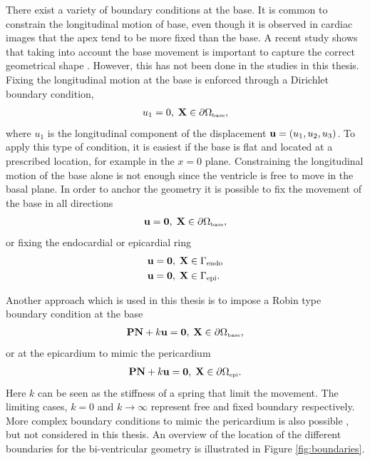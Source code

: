 There exist a variety of boundary conditions at the base.
It is common to constrain the longitudinal motion of
base, even though it is observed in cardiac images that the apex tend
to be more fixed than the base. A recent study shows that taking into
account the base movement is important to capture the correct
geometrical shape \cite{palit2016passive}. However, this has not been
done in the studies in this thesis.
Fixing the longitudinal motion at the base is enforced through a
Dirichlet boundary condition,
\begin{align}
  u_1 = 0,  \;  \mathbf{X} \in \partial \Omega_{ \textnormal{\tiny\text{base}}},
\end{align}
where $u_1$ is the longitudinal component of the displacement $\mathbf{u} =
(u_1, u_2, u_3)$. To apply this type of condition, it is easiest if
the base is flat and located at a prescribed location, for example in
the $x= 0$ plane. Constraining the longitudinal motion of the base
alone is not enough since the ventricle is free to move in the basal
plane. In order to anchor the geometry it is possible to fix the
movement of the base in all directions
\begin{align}
  \mathbf{u} = \mathbf{0},  \;  \mathbf{X} \in \partial \Omega_{ \textnormal{\tiny\text{base}}},
\end{align}
or fixing the endocardial or epicardial ring
\begin{align}
  \mathbf{u} &= \mathbf{0},  \;  \mathbf{X} \in \Gamma_{\mathrm{endo}} \\
  \mathbf{u} &= \mathbf{0},  \;  \mathbf{X} \in \Gamma_{\mathrm{epi}}.
\end{align}

Another approach which is used in this thesis is to impose a Robin
type boundary condition at the base
\begin{align}
  \mathbf{P} \mathbf{N} + k \mathbf{u} = \mathbf{0},  \;  \mathbf{X} \in \partial \Omega_{ \textnormal{\tiny\text{base}}}, 
\end{align}
or at the epicardium to mimic the pericardium
\begin{align}
  \mathbf{P} \mathbf{N} + k \mathbf{u} = \mathbf{0},  \;  \mathbf{X} \in \partial \Omega_{ \textnormal{\tiny \text{epi}}}.
\end{align}
Here $k$ can be seen as the stiffness of a spring that limit the
movement. The limiting cases, $k = 0$ and $k \rightarrow
\infty$ represent free and fixed boundary respectively.
More complex boundary conditions to mimic the pericardium is also
possible \cite{fritz2014simulation}, but not considered in this thesis.
An overview of the location of the different boundaries for the
bi-ventricular geometry is illustrated in Figure \ref{fig:boundaries}.


